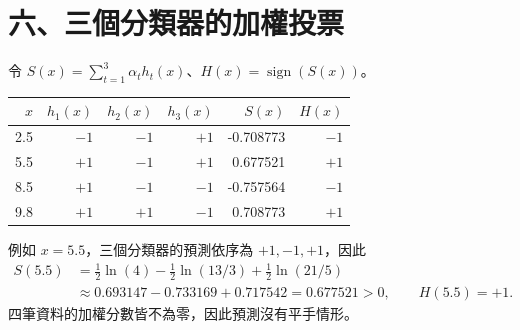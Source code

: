 \section*{六、三個分類器的加權投票}
令 $S(x)=\sum_{t=1}^3\alpha_t h_t(x)$、$H(x)=\operatorname{sign}(S(x))$。
\begin{center}
\label{tab:predictions}
\begin{tabular}{rrrrrr}
\toprule
$x$ & $h_1(x)$ & $h_2(x)$ & $h_3(x)$ & $S(x)$ & $H(x)$ \\
\midrule
2.5 & $-1$ & $-1$ & $+1$ & -0.708773 & $-1$ \\
5.5 & $+1$ & $-1$ & $+1$ & 0.677521 & $+1$ \\
8.5 & $+1$ & $-1$ & $-1$ & -0.757564 & $-1$ \\
9.8 & $+1$ & $+1$ & $-1$ & 0.708773 & $+1$ \\
\bottomrule
\end{tabular}
\end{center}
例如 $x=5.5$，三個分類器的預測依序為 $+1,-1,+1$，因此
\begin{align*}S(5.5)&=\tfrac12\ln(4)-\tfrac12\ln(13/3)+\tfrac12\ln(21/5)\\&\approx 0.693147-0.733169+0.717542=0.677521>0,\qquad H(5.5)=+1.\end{align*}
四筆資料的加權分數皆不為零，因此預測沒有平手情形。
